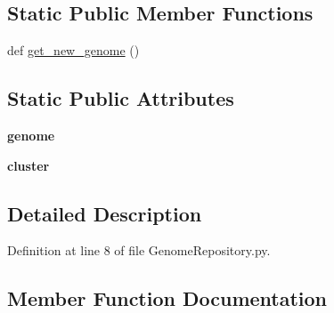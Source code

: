 \subsection*{Static Public Member Functions}
\begin{DoxyCompactItemize}
\item 
def \hyperlink{class_n_e_a_t___py_genetics_1_1_n_e_a_t_1_1_repository_1_1_genome_repository_1_1_genome_repository_a2ac10279f99269dc45fb9ed047c37fb9}{get\+\_\+new\+\_\+genome} ()
\end{DoxyCompactItemize}
\subsection*{Static Public Attributes}
\begin{DoxyCompactItemize}
\item 
{\bfseries genome}\hypertarget{class_n_e_a_t___py_genetics_1_1_n_e_a_t_1_1_repository_1_1_genome_repository_1_1_genome_repository_a23662b9337cfca1f402b206989747f45}{}\label{class_n_e_a_t___py_genetics_1_1_n_e_a_t_1_1_repository_1_1_genome_repository_1_1_genome_repository_a23662b9337cfca1f402b206989747f45}

\item 
{\bfseries cluster}\hypertarget{class_n_e_a_t___py_genetics_1_1_n_e_a_t_1_1_repository_1_1_genome_repository_1_1_genome_repository_a8932d6257b6a5e28ddc6aa822585eef0}{}\label{class_n_e_a_t___py_genetics_1_1_n_e_a_t_1_1_repository_1_1_genome_repository_1_1_genome_repository_a8932d6257b6a5e28ddc6aa822585eef0}

\end{DoxyCompactItemize}


\subsection{Detailed Description}


Definition at line 8 of file Genome\+Repository.\+py.



\subsection{Member Function Documentation}
